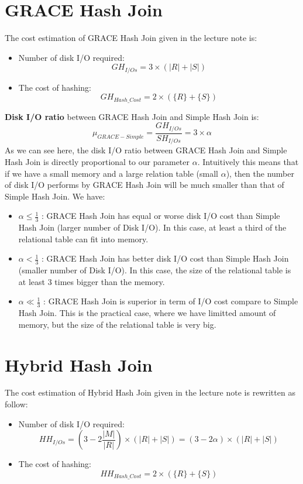 \documentclass[a4paper,12pt]{article}
\begin{document}
\section{GRACE Hash Join}

The cost estimation of GRACE Hash Join given in the lecture note is:
\begin{itemize}
	\item Number of disk I/O required: $$GH_{I/Os} = 3 \times (|R| + |S|)$$
	\item The cost of hashing: $$GH_{Hash\_Cost} = 2 \times (\{R\} + \{S\})$$
\end{itemize}

\noindent
\textbf{Disk I/O ratio} between GRACE Hash Join and Simple Hash Join is: $$ \mu_{GRACE-Simple} = \frac{GH_{I/Os}}{SH_{I/Os}} = 3 \times \alpha $$
\noindent
As we can see here, the disk I/O ratio between GRACE Hash Join and Simple Hash Join is directly proportional to our parameter $\alpha$. Intuitively this means that if we have a small memory and a large relation table (small $\alpha$), then the number of disk I/O performs by GRACE Hash Join will be much smaller than that of Simple Hash Join. We have:
\begin{itemize}
	\item $\alpha \leq \frac{1}{3}$ : GRACE Hash Join has equal or worse disk I/O cost than Simple Hash Join (larger number of Disk I/O). In this case, at least a third of the relational table can fit into memory.
	\item $\alpha < \frac{1}{3}$ : GRACE Hash Join has better disk I/O cost than Simple Hash Join (smaller number of Disk I/O). In this case, the size of the relational table is at least 3 times bigger than the memory.
	\item $\alpha \ll \frac{1}{3}$ : GRACE Hash Join is superior in term of I/O cost compare to Simple Hash Join. This is the practical case, where we have limitted amount of memory, but the size of the relational table is very big.
\end{itemize}




\section{Hybrid Hash Join}

The cost estimation of Hybrid Hash Join given in the lecture note is rewritten as follow:
\begin{itemize}
	\item Number of disk I/O required: $$HH_{I/Os} = (3-2\frac{|M|}{|R|}) \times (|R| + |S|) = (3-2\alpha) \times (|R| + |S|) $$
	\item The cost of hashing: $$HH_{Hash\_Cost} = 2 \times (\{R\} + \{S\})$$
\end{itemize}
\end{document}
